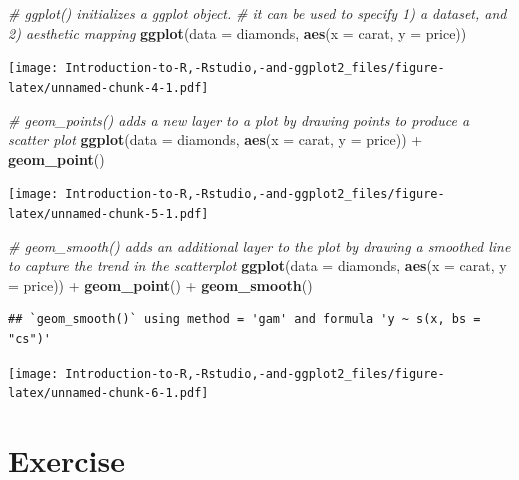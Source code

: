 \documentclass[]{book}
\newenvironment{Shaded}{\begin{snugshade}}{\end{snugshade}}
\newcommand{\KeywordTok}[1]{\textcolor[rgb]{0.13,0.29,0.53}{\textbf{{#1}}}}
\newcommand{\DataTypeTok}[1]{\textcolor[rgb]{0.13,0.29,0.53}{{#1}}}
\newcommand{\StringTok}[1]{\textcolor[rgb]{0.31,0.60,0.02}{{#1}}}
\newcommand{\CommentTok}[1]{\textcolor[rgb]{0.56,0.35,0.01}{\textit{{#1}}}}
\newcommand{\NormalTok}[1]{{#1}}
\begin{document}
\begin{Shaded}
\begin{Highlighting}[]
\CommentTok{# ggplot() initializes a ggplot object.}
\CommentTok{# it can be used to specify 1) a dataset, and 2) aesthetic mapping}
\KeywordTok{ggplot}\NormalTok{(}\DataTypeTok{data =} \NormalTok{diamonds, }\KeywordTok{aes}\NormalTok{(}\DataTypeTok{x =} \NormalTok{carat, }\DataTypeTok{y =} \NormalTok{price))}
\end{Highlighting}
\end{Shaded}

\texttt{[image: Introduction-to-R,-Rstudio,-and-ggplot2\_files/figure-latex/unnamed-chunk-4-1.pdf]}

\begin{Shaded}
\begin{Highlighting}[]
\CommentTok{# geom_points() adds a new layer to a plot by drawing points to produce a scatter plot }
\KeywordTok{ggplot}\NormalTok{(}\DataTypeTok{data =} \NormalTok{diamonds, }\KeywordTok{aes}\NormalTok{(}\DataTypeTok{x =} \NormalTok{carat, }\DataTypeTok{y =} \NormalTok{price)) +}\StringTok{ }\KeywordTok{geom_point}\NormalTok{()}
\end{Highlighting}
\end{Shaded}

\texttt{[image: Introduction-to-R,-Rstudio,-and-ggplot2\_files/figure-latex/unnamed-chunk-5-1.pdf]}

\begin{Shaded}
\begin{Highlighting}[]
\CommentTok{# geom_smooth() adds an additional layer to the plot by drawing a smoothed line to capture the trend in the scatterplot}
\KeywordTok{ggplot}\NormalTok{(}\DataTypeTok{data =} \NormalTok{diamonds, }\KeywordTok{aes}\NormalTok{(}\DataTypeTok{x =} \NormalTok{carat, }\DataTypeTok{y =} \NormalTok{price)) +}\StringTok{ }\KeywordTok{geom_point}\NormalTok{() +}\StringTok{ }\KeywordTok{geom_smooth}\NormalTok{()}
\end{Highlighting}
\end{Shaded}

\begin{verbatim}
## `geom_smooth()` using method = 'gam' and formula 'y ~ s(x, bs = "cs")'
\end{verbatim}

\texttt{[image: Introduction-to-R,-Rstudio,-and-ggplot2\_files/figure-latex/unnamed-chunk-6-1.pdf]}

\section{Exercise}\label{exercise}
\end{document}
